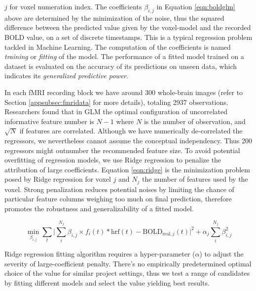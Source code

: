 \(j\) for voxel numeration index. The coefficients \(\beta_{i,j}\) in Equation \ref{eqn:boldglm} above are determined by the minimization of the noise, thus the squared difference between the predicted value given by the voxel-model and the recorded BOLD value, on a set of discrete timestamps. This is a typical regression problem tackled in Machine Learning. The computation of the coefficients is named \emph{training} or \emph{fitting} of the model. The performance of a fitted model trained on a dataset is evaluated on the accuracy of its predictions on unseen data, which indicates its \emph{generalized predictive power}.

In each fMRI recording block we have around 300 whole-brain images (refer to Section \ref{appsubsec:fmridata} for more details), totaling 2937 observations. Researchers \parencite{huaOptimalNumberFeatures2005} found that in GLM the optimal configuration of uncorrelated informative feature number is \(N - 1\) where \(N\) is the number of observation, and \(\sqrt{N}\) if features are correlated. Although we have numerically de-correlated the regressors, we nevertheless cannot assume the conceptual independency. Thus 200 regressors might outnumber the recommended feature size. To avoid potential overfitting of regression models, we use Ridge regression to penalize the attribution of large coefficients. Equation \ref{eqn:ridge} is the minimization problem posed by Ridge regression for voxel \(j\) and \(N_j\) the number of features used by the voxel. Strong penalization reduces potential noises by limiting the chance of particular feature columns weighing too much on final prediction, therefore promotes the robustness and generalizability of a fitted model.

\begin{equation}
    \min_{\beta_{i,j}}{\sum_{t}{\vert\sum_{i}^{N_j}{\beta_{i,j} \times f_{i}(t) * \text{hrf}(t)} - \text{BOLD}_{\text{real}, j}(t)\vert ^2} + \alpha_j \sum_{i}^{N_j}{\beta_{i,j}^2}}
\label{eqn:ridge}
    \end{equation}

Ridge regression fitting algorithm requires a hyper-parameter (\(\alpha\)) to adjust the severity of large-coefficient penalty. There's no empirically predetermined optimal choice of the value for similar project settings, thus we test a range of candidates by fitting different models and select the value yielding best results.

